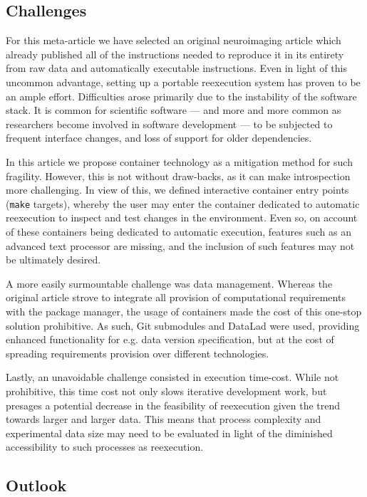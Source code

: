 \subsection{Challenges}
For this meta-article we have selected an original neuroimaging article which already published all of the instructions needed to reproduce it in its entirety from raw data and automatically executable instructions.
Even in light of this uncommon advantage, setting up a portable reexecution system has proven to be an ample effort.
Difficulties arose primarily due to the instability of the software stack.
It is common for scientific software — and more and more common as researchers become involved in software development — to be subjected to frequent interface changes, and loss of support for older dependencies.

In this article we propose container technology as a mitigation method for such fragility.
However, this is not without draw-backs, as it can make introspection more challenging.
In view of this, we defined interactive container entry points (\texttt{make} targets), whereby the user may enter the container dedicated to automatic reexecution to inspect and test changes in the environment.
Even so, on account of these containers being dedicated to automatic execution, features such as an advanced text processor are missing, and the inclusion of such features may not be ultimately desired.

A more easily surmountable challenge was data management.
Whereas the original article strove to integrate all provision of computational requirements with the package manager, the usage of containers made the cost of this one-stop solution prohibitive.
As such, Git submodules and DataLad were used, providing enhanced functionality for e.g. data version specification, but at the cost of spreading requirements provision over different technologies.

Lastly, an unavoidable challenge consisted in execution time-cost.
While not prohibitive, this time cost not only slows iterative development work, but presages a potential decrease in the feasibility of reexecution given the trend towards larger and larger data.
This means that process complexity and experimental data size may need to be evaluated in light of the diminished accessibility to such processes as reexecution.

\subsection{Outlook}

